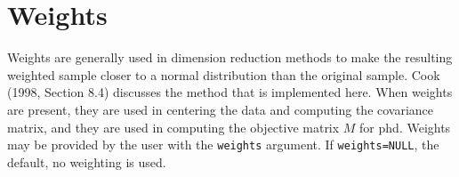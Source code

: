 \documentclass{article}
\newcommand{\arc}{{\em Arc}}
\newcommand{\dcode}[1]{{\small{\tt #1}}}
\newcommand{\sir}{{\sffamily sir}}
\newcommand{\save}{{\sffamily save}}
\newcommand{\phd}{{\sffamily phd}}
\begin{document}
\section{Weights}
Weights are generally used in dimension reduction methods to make the resulting
weighted sample closer to a normal distribution than the original sample.
Cook (1998, Section 8.4) discusses the method that is implemented here.
When weights are present, they are used in centering the data and computing
the covariance matrix, and they are used in computing the objective matrix
$M$ for \phd.
Weights may be provided by the user with the \dcode{weights}
argument.  If
\dcode{weights=NULL}, the default, no weighting is used.
\end{document}
